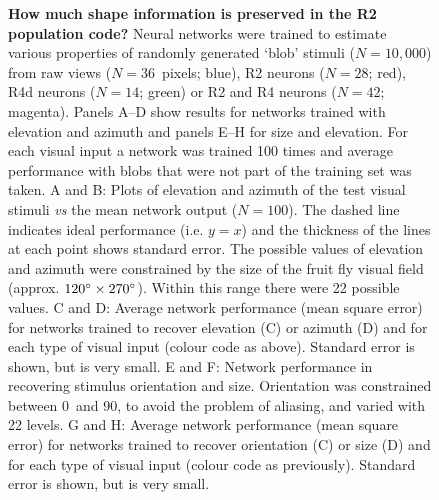 \begin{figure}[htp]
	\caption{
		{\bf How much shape information is preserved in the R2 population code?}
		Neural networks were trained to estimate various properties of randomly generated `blob' stimuli ($N=10,000$) from raw views ($N=36$~pixels; blue), R2 neurons ($N=28$; red), R4d neurons ($N=14$; green) or R2 and R4 neurons ($N=42$; magenta). Panels A--D show results for networks trained with elevation and azimuth and panels E--H for size and elevation. For each visual input a network was trained 100 times and average performance with blobs that were not part of the training set was taken.
		A and B: Plots of elevation and azimuth of the test visual stimuli \emph{vs} the mean network output ($N=100$). The dashed line indicates ideal performance (i.e. $y=x$) and the thickness of the lines at each point shows standard error.
		The possible values of elevation and azimuth were constrained by the size of the fruit fly visual field (approx. $120\degree \times 270\degree$). Within this range there were 22 possible values.
		C and D: Average network performance (mean square error) for networks trained to recover elevation (C) or azimuth (D) and for each type of visual input (colour code as above). Standard error is shown, but is very small.
		E and F: Network performance in recovering stimulus orientation and size. Orientation was constrained between 0\degree\ and 90\degree, to avoid the problem of aliasing, and varied with 22 levels.
		G and H: Average network performance (mean square error) for networks trained to recover orientation (C) or size (D) and for each type of visual input (colour code as previously). Standard error is shown, but is very small.
		}
	\label{fig:elazorsi}
\end{figure}

